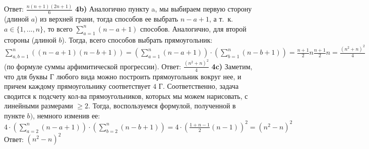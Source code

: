 \documentclass[12pt,a4paper,fleqn]{article}
\begin{document}
Ответ: $\frac{n(n + 1)(2n + 1)}{6}$ \newline\newline
{\bf 4b)} Аналогично пункту a, мы выбираем первую сторону (длиной $a$) из верхней грани, тогда способов ее выбрать $n - a + 1$, а т.~к. $a \in \{1,...,n\}$, то всего $\sum_{a = 1}^n (n - a + 1)$ способов. Аналогично, для второй стороны (длиной $b$). Тогда, всего способов выбрать прямоугольник: $\sum_{a, b = 1}^n ((n - a + 1)(n - b + 1)) = (\sum_{a = 1}^n (n - a + 1)) \cdot (\sum_{b = 1}^n (n - b + 1)) = \frac{n + 1}{2}n\frac{n + 1}{2}n = \frac{(n^2 + n)^2}{4}$ (по формуле суммы арфимитической прогрессии). \newline
Ответ: $\frac{(n^2 + n)^2}{4}$ \newline \newline
{\bf 4c)} Заметим, что для буквы Г любого вида можно построить прямоугольник вокруг нее, и причем каждому прямоугольнику соответствует $4$ Г. Соответственно, задача сводится к подсчету кол-ва прямоугольников, которых мы можем нарисовать, с линейными размерами $\geqslant2$. Тогда, воспользуемся формулой, полученной в пункте $b)$, немного изменив ее: \newline
$4 \cdot (\sum_{a = 2}^n (n - a + 1)) \cdot (\sum_{b = 2}^n (n - b + 1)) = 4 \cdot (\frac{1 + n - 1}{2}(n - 1))^2 = (n^2 - n)^2$ \newline
Ответ: $(n^2 - n)^2$
\end{document}
